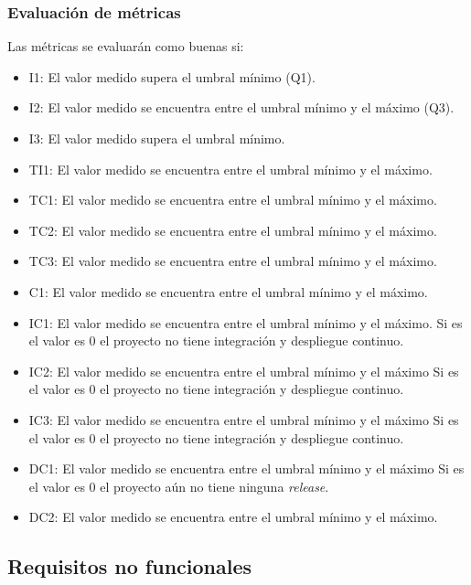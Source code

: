 \subsubsection{Evaluación de métricas}\label{sect:B_5_1_2}
Las métricas se evaluarán como buenas si:
\begin{itemize}
	\item I1: El valor medido supera el umbral mínimo (Q1).
	\item I2: El valor medido se encuentra entre el umbral mínimo y el máximo (Q3).
	\item I3: El valor medido supera el umbral mínimo.
	\item TI1: El valor medido se encuentra entre el umbral mínimo y el máximo.
	\item TC1: El valor medido se encuentra entre el umbral mínimo y el máximo.
	\item TC2: El valor medido se encuentra entre el umbral mínimo y el máximo.
	\item TC3: El valor medido se encuentra entre el umbral mínimo y el máximo.
	\item C1: El valor medido se encuentra entre el umbral mínimo y el máximo.
	\item IC1: El valor medido se encuentra entre el umbral mínimo y el máximo. Si es el valor es 0 el proyecto no tiene integración y despliegue continuo.
	\item IC2: El valor medido se encuentra entre el umbral mínimo y el máximo Si es el valor es 0 el proyecto no tiene integración y despliegue continuo.
	\item IC3: El valor medido se encuentra entre el umbral mínimo y el máximo Si es el valor es 0 el proyecto no tiene integración y despliegue continuo.
	\item DC1: El valor medido se encuentra entre el umbral mínimo y el máximo Si es el valor es 0 el proyecto aún no tiene ninguna \textit{release}.
	\item DC2: El valor medido se encuentra entre el umbral mínimo y el máximo.
\end{itemize}

\subsection{Requisitos no funcionales}

